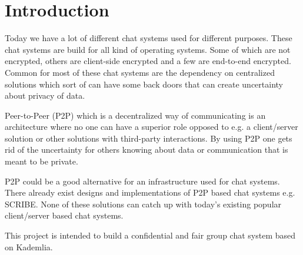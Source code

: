\chapter{Introduction}\label{cha:introduction}
Today we have a lot of different chat systems used for different purposes. These chat systems are build for all kind of operating systems. 
Some of which are not encrypted, others are client-side encrypted and a few are end-to-end encrypted. Common for most of these chat systems are the dependency on centralized solutions which sort of can have some back doors that can create uncertainty about privacy of data. 

Peer-to-Peer (P2P) which is a decentralized way of communicating is an architecture where no one can have a superior role opposed to e.g. a client/server solution or other solutions with third-party interactions. By using P2P one gets rid of the uncertainty for others knowing about data or communication that is meant to be private. 

P2P could be a good alternative for an infrastructure used for chat systems. There already exist designs and implementations of P2P based chat systems e.g. SCRIBE. None of these solutions can catch up with today's existing popular client/server based chat systems. 

This project is intended to build a confidential and fair group chat system based on Kademlia.

